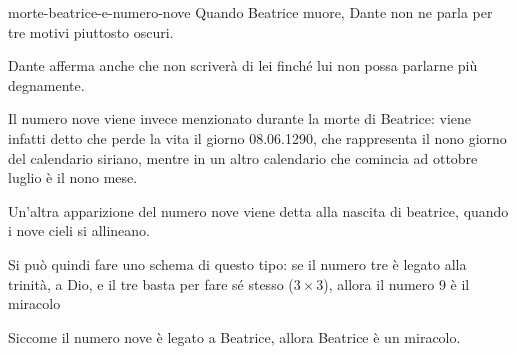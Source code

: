 \documentclass[preview]{standalone}
\begin{document}
\begin{snippet}{morte-beatrice-e-numero-nove}
    Quando Beatrice muore, Dante non ne parla per tre motivi piuttosto oscuri. 
    
    Dante afferma anche che non scriverà di lei finché lui non possa parlarne più degnamente.

    \vspace{0.25cm}

    Il numero nove viene invece menzionato durante la morte di Beatrice: viene infatti detto che
    perde la vita il giorno 08.06.1290, che rappresenta il nono giorno del calendario siriano, mentre
    in un altro calendario che comincia ad ottobre luglio è il nono mese.

    \vspace{0.25cm}

    Un'altra apparizione del numero nove viene detta alla nascita di beatrice, quando i nove cieli si allineano.

    \vspace{0.25cm}

    Si può quindi fare uno schema di questo tipo: se il numero tre è legato alla trinità, a Dio,
    e il tre basta per fare sé stesso (\(3 \times 3\)), allora il numero 9 è il miracolo

    \vspace{0.25cm}

    \begin{center}
    \end{center}

    \vspace{0.25cm}

    Siccome il numero nove è legato a Beatrice, allora Beatrice è un miracolo.

\end{snippet}
\end{document}
